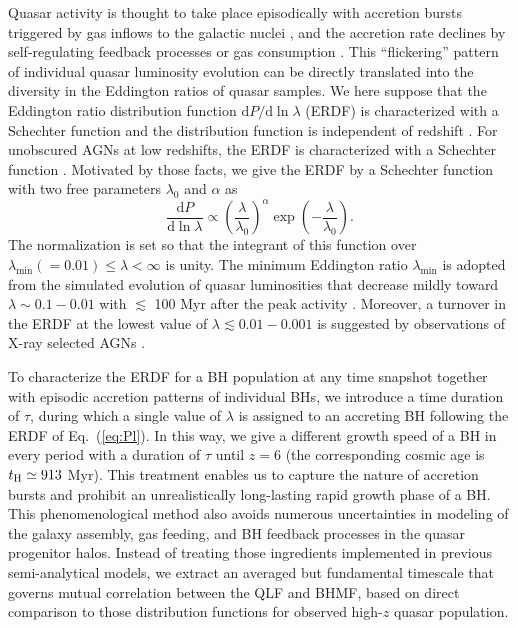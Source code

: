 \documentclass[twocolumn, twocolappendix]{aastex63}
\newcommand{\tlife}{\tau}
\newcommand{\D}{\mathrm{d}}
\begin{document}
\begin{CJK*}{UTF8}{gbsn}
Quasar activity is thought to take place episodically with accretion bursts triggered by gas inflows to the galactic nuclei
\citep{2005Natur.433..604D,2005ApJ...630..705H}, 
and the accretion rate declines by self-regulating feedback processes \citep[e.g.,][]{2008ApJ...686..815Y,2011ApJ...737...26N} 
or gas consumption \citep{1991MNRAS.248..754P,2005ApJ...634..901Y,2007MNRAS.377L..25K}. 
This ``flickering'' pattern of individual quasar luminosity evolution can be directly translated into the diversity 
in the Eddington ratios of quasar samples. 
We here suppose that the Eddington ratio distribution function $\D P/ \D\ln\lambda$ (ERDF) is characterized
with a Schechter function and the distribution function is independent of redshift 
\citep{2006ApJ...639..700H,2009ApJ...698.1550H}.
For unobscured AGNs at low redshifts, the ERDF is characterized with a Schechter function
\citep{2015MNRAS.447.2085S,2016ApJ...826...12J,2018MNRAS.474.1225A}.
Motivated by those facts, we give the ERDF by a Schechter function with two free parameters $\lambda_0$ and $\alpha$ as
%
\begin{equation}
  \label{eq:Pl}
  \frac{\D P}{ \D \ln \lambda} \propto
  \left(\frac{\lambda} {\lambda_0} \right)^\alpha \exp{\left(-\frac{\lambda}{\lambda_0}\right)}.
\end{equation}
%
The normalization is set so that the integrant of this function over $\lambda_\mathrm{min}(=0.01) \leq \lambda < \infty$ is unity.
The minimum Eddington ratio $\lambda_\mathrm{min}$ is adopted from the simulated evolution of quasar luminosities 
that decrease mildly toward $\lambda \sim 0.1-0.01$ with $\lesssim$ 100 Myr after the peak activity \citep{2011ApJ...737...26N}.
Moreover, a turnover in the ERDF at the lowest value of $\lambda\lesssim 0.01-0.001$ is suggested by observations of X-ray selected AGNs \citep{2018MNRAS.474.1225A}.  


To characterize the ERDF for a BH population at any time snapshot together with episodic 
accretion patterns of individual BHs, 
we introduce a time duration of $\tlife$, during which a single value of $\lambda$ is assigned to an accreting BH
following the ERDF of Eq.~(\ref{eq:Pl}).
In this way, we give a different growth speed of a BH in every period with a duration of $\tlife$ until $z=6$ 
(the corresponding cosmic age is $t_{\rm H}\simeq 913$ Myr).
This treatment enables us to capture the nature of accretion bursts and prohibit an unrealistically 
long-lasting rapid growth phase of a BH.
This phenomenological method also avoids numerous uncertainties in modeling of the galaxy assembly, 
gas feeding, and BH feedback processes in the quasar progenitor halos.
Instead of treating those ingredients implemented in previous semi-analytical models, we extract 
an averaged but fundamental timescale that governs mutual correlation between the QLF and BHMF,
based on direct comparison to those distribution functions for observed high-$z$ quasar population.



\end{CJK*}
\end{document}
